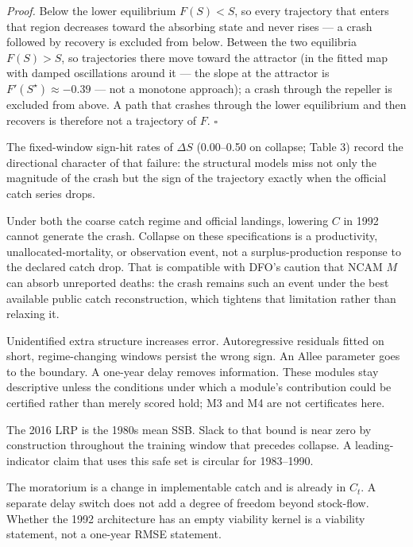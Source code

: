 \documentclass[11pt]{article}
\begin{document}
\emph{Proof.} Below the lower equilibrium \(F(S) < S\), so every
trajectory that enters that region decreases toward the absorbing state
and never rises --- a crash followed by recovery is excluded from below.
Between the two equilibria \(F(S) > S\), so trajectories there move
toward the attractor (in the fitted map with damped oscillations around
it --- the slope at the attractor is \(F'(S^\star) \approx -0.39\) ---
not a monotone approach); a crash through the repeller is excluded from
above. A path that crashes through the lower equilibrium and then
recovers is therefore not a trajectory of \(F\). \ensuremath{\square}

The fixed-window sign-hit rates of \(\Delta S\) (0.00--0.50 on collapse;
Table 3) record the directional character of that failure: the
structural models miss not only the magnitude of the crash but the sign
of the trajectory exactly when the official catch series drops.

Under both the coarse catch regime and official landings, lowering \(C\)
in 1992 cannot generate the crash. Collapse on these specifications is a
productivity, unallocated-mortality, or observation event, not a
surplus-production response to the declared catch drop. That is
compatible with DFO's caution that NCAM \(M\) can absorb unreported
deaths: the crash remains such an event under the best available public
catch reconstruction, which tightens that limitation rather than
relaxing it.

Unidentified extra structure increases error. Autoregressive residuals
fitted on short, regime-changing windows persist the wrong sign. An
Allee parameter goes to the boundary. A one-year delay removes
information. These modules stay descriptive unless the conditions under
which a module's contribution could be certified rather than merely
scored hold; M3 and M4 are not certificates here.

The 2016 LRP is the 1980s mean SSB. Slack to that bound is near zero by
construction throughout the training window that precedes collapse. A
leading-indicator claim that uses this safe set is circular for
1983--1990.

The moratorium is a change in implementable catch and is already in
\(C_t\). A separate delay switch does not add a degree of freedom beyond
stock-flow. Whether the 1992 architecture has an empty viability kernel
is a viability statement, not a one-year RMSE statement.
\end{document}
